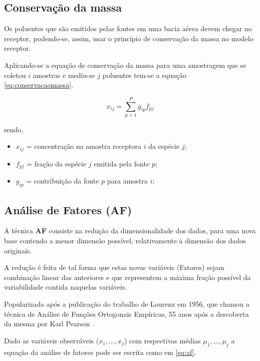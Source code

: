 \subsection{Conservação da massa}

Os poluentes que são emitidos pelas fontes em uma bacia aérea devem chegar no 
receptor, podendo-se, assim, usar o princípio de conservação da massa 
no modelo receptor. 

Aplicando-se a equação de conservação da massa para uma amostragem que se 
coletou $i$ amostras e mediu-se $j$ poluentes tem-se a 
equação \ref{eq:conservacaomassa}.

\begin{equation}
  \label{eq:conservacaomassa}
  x_{ij} = \sum_{p=1}^{P} g_{ip}f_{pj} %
\end{equation} 

sendo,
\begin{itemize}
  \item $x_{ij}$ = concentração na amostra receptora $i$ da espécie $j$;
  \item $f_{pj}$ = fração da espécie $j$ emitida pela fonte $p$;
  \item $g_{ip}$ = contribuição da fonte $p$ para amostra $i$;
\end{itemize}

\subsection{Análise de Fatores (AF)}

A técnica \textbf{AF} consiste na redução da dimensionalidade dos dados, 
para uma nova base contendo a menor dimensão possível, 
relativamente à dimensão dos dados originais.

A redução é feita de tal forma que estas novas variáveis (Fatores) 
sejam combinação linear das anteriores e que representem a máxima fração possível da 
variabilidade contida naquelas variáveis. 

Popularizada após a publicação do trabalho de Lourenz em 1956, que chamou 
a técnica de Análise de Funções Ortogonais Empíricas, 55 anos após a 
descoberta da mesma por Karl Pearson \citep{bartholomew2011}.

Dado as variáveis observáveis ($x_1,\dots,x_j$) com 
respectivas médias $\mu_1,\dots,\mu_j$ a equação da análise de fatores 
pode ser escrita como em \ref{eq:af}. 
 
